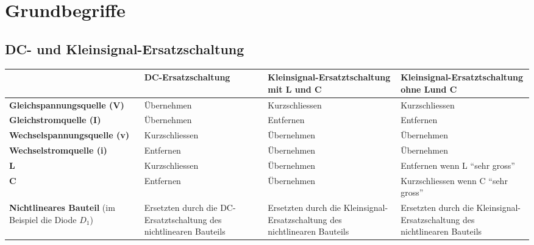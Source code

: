 \section{Grundbegriffe}
	
		\subsection{DC- und Kleinsignal-Ersatzschaltung}
			\begin{tabular}{|p{4.3cm}|p{3.93cm}|p{4.5cm}|p{4.5cm}|}
			\hline
			& \footnotesize{\textbf{DC-Ersatzschaltung}} 
			& \footnotesize{\textbf{Kleinsignal-Ersatztschaltung mit L und C}}	
			& \footnotesize{\textbf{Kleinsignal-Ersatztschaltung ohne L\footnotemark[1] und C\footnotemark[2]}}
			\\ \hline
			\footnotesize{\textbf{Gleichspannungsquelle (V)}} & Übernehmen & Kurzschliessen\footnotemark[3] & Kurzschliessen\footnotemark[3] 
			\\ \hline
			\footnotesize{\textbf{Gleichstromquelle (I)}} & Übernehmen & Entfernen\footnotemark[4] & Entfernen\footnotemark[4] 
			\\ \hline
			\footnotesize{\textbf{Wechselspannungsquelle (v)}} & Kurzschliessen\footnotemark[3] & Übernehmen & Übernehmen
			\\ \hline
			\footnotesize{\textbf{Wechselstromquelle (i)}} & Entfernen\footnotemark[4] & Übernehmen & Übernehmen
			\\ \hline
			\footnotesize{\textbf{L}} & Kurzschliessen\footnotemark[5] & Übernehmen & Entfernen wenn L ``sehr gross''\footnotemark[1]
			\\ \hline
			\footnotesize{\textbf{C}} & Entfernen\footnotemark[6] & Übernehmen & Kurzschliessen wenn C ``sehr gross''\footnotemark[2]
			\\ \hline
			\footnotesize{\textbf{Nichtlineares Bauteil}} (im Beispiel die Diode $D_1$) 
			& Ersetzten durch die DC-Ersatztschaltung des nichtlinearen Bauteils
			& Ersetzten durch die Kleinsignal-Ersatzschaltung des nichtlinearen Bauteils
			& Ersetzten durch die Kleinsignal-Ersatzschaltung des nichtlinearen Bauteils
			\\ \hline 
			\end{tabular}
			
